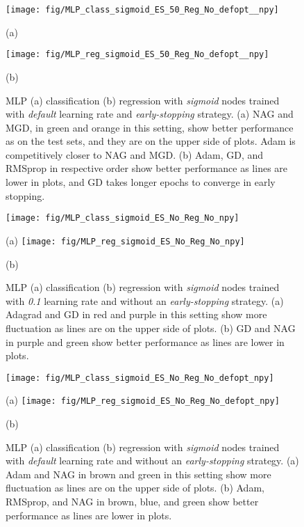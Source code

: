 \documentclass[11pt,a4paper]{article}
\begin{document}
\begin{figure}
        \centering
        \texttt{[image: fig/MLP\_class\_sigmoid\_ES\_50\_Reg\_No\_defopt\_\_npy]}


        (a)
        
        \centering
        \texttt{[image: fig/MLP\_reg\_sigmoid\_ES\_50\_Reg\_No\_defopt\_\_npy]}
        
        (b)
        \caption{MLP (a) classification (b) regression with \textit{sigmoid} nodes trained with \textit{default} learning rate  and \textit{early-stopping} strategy. (a) NAG and MGD, in green and orange in this setting, show better performance as on the test sets, and they are on the upper side of plots. Adam is competitively closer to NAG and MGD. (b) Adam, GD, and RMSprop in respective order show better performance as lines are lower in plots, and GD takes longer epochs to converge in early stopping.
        \label{fig:MLP_Sig_ES_50_lrD}}
    \end{figure}
    
\begin{figure}
        \centering
        \texttt{[image: fig/MLP\_class\_sigmoid\_ES\_No\_Reg\_No\_npy]}
        \label{fig:..}


        (a)
        \centering
        \texttt{[image: fig/MLP\_reg\_sigmoid\_ES\_No\_Reg\_No\_npy]}
        
        (b)
        \caption{MLP (a) classification (b) regression with \textit{sigmoid} nodes trained with \textit{0.1} learning rate  and without an \textit{early-stopping} strategy. (a) Adagrad and GD in red and purple in this setting show more fluctuation as lines are on the upper side of plots. (b) GD and NAG in purple and green show better performance as lines are lower in plots.
        \label{fig:MLP_Sig_ES_No_lr1}}
    \end{figure}
    
\begin{figure}
        \centering
        \texttt{[image: fig/MLP\_class\_sigmoid\_ES\_No\_Reg\_No\_defopt\_npy]}


        (a)
        \centering
        \texttt{[image: fig/MLP\_reg\_sigmoid\_ES\_No\_Reg\_No\_defopt\_npy]}
        
        (b)
        \caption{MLP (a) classification (b) regression with \textit{sigmoid} nodes trained with \textit{default} learning rate  and without an \textit{early-stopping} strategy. (a) Adam and NAG in brown and green in this setting show more fluctuation as lines are on the upper side of plots. (b) Adam, RMSprop, and NAG in brown, blue, and green show better performance as lines are lower in plots.
        \label{fig:MLP_Sig_ES_No_lrD}}
    \end{figure}
    
\end{document}
